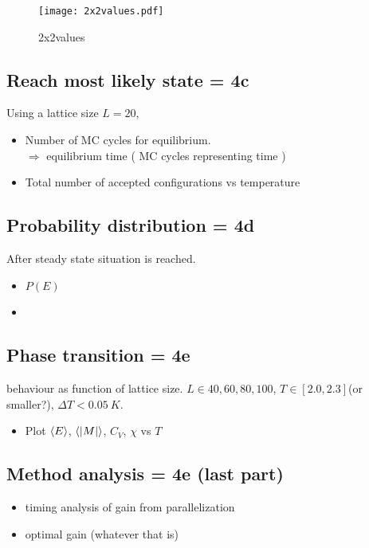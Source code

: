 \documentclass[10pt]{article}
\begin{document}
\begin{multicols}{2}
\begin{figure}[H]
    \centering
    \texttt{[image: 2x2values.pdf]}
    \caption{2x2values}
    \label{fig:2x2values}
\end{figure}

\subsection{Reach most likely state = 4c}
Using a lattice size $L=20$, 

\begin{itemize}
    \item Number of MC cycles for equilibrium.\\
        $\Rightarrow$ equilibrium time ( MC cycles representing time )
    \item Total number of accepted configurations vs temperature
\end{itemize}


\subsection{Probability distribution = 4d}
After steady state situation is reached.

\begin{itemize}
    \item $P(E)$
    \item 
\end{itemize}


\subsection{Phase transition = 4e}
\label{sub:phase_transition}


behaviour as function of lattice size. $L \in {40, 60, 80, 100}$, $T \in
[2.0,2.3]$(or smaller?), $\Delta T < \SI{0.05}{K}$.

\begin{itemize}
    \item Plot $\ev E$,  $\ev{ |M| }$, $C_V$, $\chi$ vs $T$
\end{itemize}

\subsection{Method analysis = 4e (last part)}

\begin{itemize}
    \item timing analysis of gain from parallelization  
    \item optimal gain (whatever that is)
\end{itemize}


\end{multicols}
\end{document}
